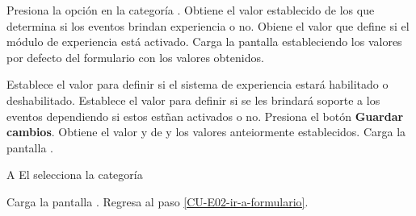 \begin{UCtrayectoria}%
%
     

    \Actor Presiona la opción {\bf {}} en la categoría .  \label{CU-E02-ir-a-formulario}
    \Sistema Obtiene el valor establecido de los  que determina si los eventos brindan experiencia o no. \label{CU-E03-formulario}
    \Sistema Obiene el valor  que define si el módulo de
             experiencia está activado.
    \Sistema Carga la pantalla  estableciendo los valores por defecto del
             formulario con los valores obtenidos.

    \Actor Establece el valor  para definir si el sistema de
           experiencia estará habilitado o deshabilitado. 
    \Actor Establece el valor  para definir
           si se les brindará soporte a los eventos dependiendo si estos estñan activados o no.
    \Actor Presiona el botón {\bf Guardar cambios}.
    \Sistema Obtiene el valor  y de  y los valores anteiormente establecidos.
    \Sistema Carga la pantalla .

\end{UCtrayectoria}

\begin{UCtrayectoriaA}{A}{%
El  selecciona la categoría }

    \Sistema Carga la pantalla .
    \Sistema Regresa al paso \ref{CU-E02-ir-a-formulario}.
\end{UCtrayectoriaA}

